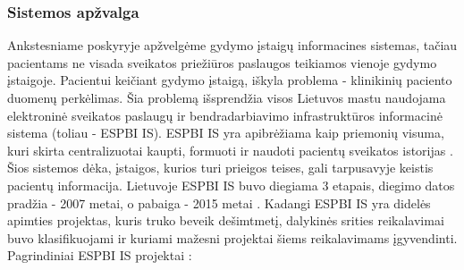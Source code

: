 \subsubsection{Sistemos apžvalga}
Ankstesniame poskyryje apžvelgėme gydymo įstaigų informacines sistemas, tačiau pacientams ne visada sveikatos priežiūros paslaugos teikiamos vienoje gydymo įstaigoje. Pacientui keičiant gydymo įstaigą, iškyla problema - klinikinių paciento duomenų perkėlimas. Šia problemą išsprendžia visos Lietuvos mastu naudojama elektroninė sveikatos paslaugų ir bendradarbiavimo infrastruktūros informacinė sistema (toliau - ESPBI IS). ESPBI IS yra apibrėžiama kaip priemonių visuma, kuri skirta centralizuotai kaupti, formuoti ir naudoti pacientų sveikatos istorijas \cite{ESPBINuostatos}. Šios sistemos dėka, įstaigos, kurios turi prieigos teises, gali tarpusavyje keistis pacientų informacija. Lietuvoje ESPBI IS buvo diegiama 3 etapais, diegimo datos pradžia - 2007 metai, o pabaiga - 2015 metai \cite{Ministras2015}. Kadangi ESPBI IS yra didelės apimties projektas, kuris truko beveik dešimtmetį, dalykinės srities reikalavimai buvo klasifikuojami ir kuriami mažesni projektai šiems reikalavimams įgyvendinti. Pagrindiniai ESPBI IS projektai \cite{Specifikacija}:
